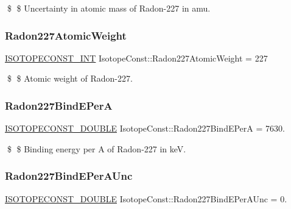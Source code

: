 \$ \$ Uncertainty in atomic mass of Radon-\/227 in amu. \mbox{\label{group___isotope_const-_radon-_rn227_ga88937c71d6257636029433c377a47122}} 
\subsubsection{\texorpdfstring{Radon227\+Atomic\+Weight}{Radon227AtomicWeight}}
{\footnotesize\ttfamily \mbox{\hyperlink{group___isotope_const-_macros_ga5f18360b3e99483a35c32d789e62621c}{I\+S\+O\+T\+O\+P\+E\+C\+O\+N\+S\+T\+\_\+\+I\+NT}} Isotope\+Const\+::\+Radon227\+Atomic\+Weight = 227}

\$ \$ Atomic weight of Radon-\/227. \mbox{\label{group___isotope_const-_radon-_rn227_ga65f52790edf533760de939dee17b0624}} 
\subsubsection{\texorpdfstring{Radon227\+Bind\+E\+PerA}{Radon227BindEPerA}}
{\footnotesize\ttfamily \mbox{\hyperlink{group___isotope_const-_macros_ga8f45a7272ce02c0b4c65c44636ed719a}{I\+S\+O\+T\+O\+P\+E\+C\+O\+N\+S\+T\+\_\+\+D\+O\+U\+B\+LE}} Isotope\+Const\+::\+Radon227\+Bind\+E\+PerA = 7630.}

\$ \$ Binding energy per A of Radon-\/227 in keV. \mbox{\label{group___isotope_const-_radon-_rn227_ga0af4528b0cf72f4831c5988d8b950f9c}} 
\subsubsection{\texorpdfstring{Radon227\+Bind\+E\+Per\+A\+Unc}{Radon227BindEPerAUnc}}
{\footnotesize\ttfamily \mbox{\hyperlink{group___isotope_const-_macros_ga8f45a7272ce02c0b4c65c44636ed719a}{I\+S\+O\+T\+O\+P\+E\+C\+O\+N\+S\+T\+\_\+\+D\+O\+U\+B\+LE}} Isotope\+Const\+::\+Radon227\+Bind\+E\+Per\+A\+Unc = 0.}

